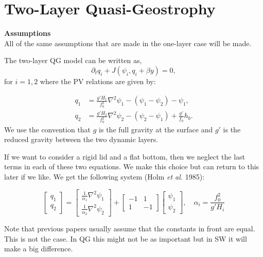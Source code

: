 \documentclass[12pt]{article}
\begin{document}
\section{Two-Layer Quasi-Geostrophy}{
    \textbf{Assumptions} \\
    All of the same assumptions that are made in the one-layer case will be made.

    The two-layer QG model can be written as,
    $$
    \partial_t q_i + J(\psi_i, q_i + \beta y) = 0,
    $$
    for $i=1,2$ where the PV relations are given by:

    \begin{align*}
        q_1 &= \frac{g'H_1}{f_0^2}\nabla^2 \psi_1 - (\psi_1 - \psi_2) - \psi_1,\\
        q_2 &= \frac{g'H_2}{f_0^2}\nabla^2 \psi_2 - (\psi_2 - \psi_1) + \frac{g'}{f_0} h_b.
    \end{align*}
    We use the convention that $g$ is the full gravity at the surface and $g'$ is the reduced gravity between the two dynamic layers.

    If we want to consider a rigid lid and a flat bottom, then we neglect the last terms in each of these two equations.  We make this choice but can return to this later if we like. We get the following system (Holm \emph{et al.} 1985):

    \begin{equation}
        \left[\begin{array}{c}
        q_1 \\
        q_2
        \end{array}\right]
        =
        \left[\begin{array}{c}
        \frac{1}{\alpha_1}\nabla^2 \psi_1 \\
        \frac{1}{\alpha_2}\nabla^2 \psi_2
        \end{array}\right]
        +
        \left[\begin{array}{cc}
        -1 & 1 \\
        1 & -1
        \end{array}\right]
        \left[\begin{array}{c}
        \psi_1 \\
        \psi_2
        \end{array}\right],
        \quad \alpha_i = \frac{f_0^2}{g'H_i}
    \end{equation}

    Note that previous papers usually assume that the constants in front are equal. This is not the case.  In QG this might not be as important but in SW it will make a big difference.

}
\end{document}
